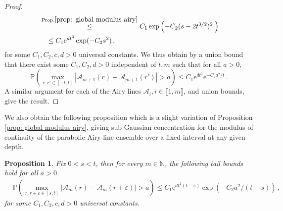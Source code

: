 \documentclass[11pt, reqno]{amsart}
\numberwithin{equation}{section}
\newcounter{dummy} \numberwithin{dummy}{section}
\newtheorem{proposition}[dummy]{Proposition}
\newcommand{\N}{\ensuremath{\mathbb{N}}}
\newcommand{\PP}{\ensuremath{\mathbb{P}}}
\begin{document}
\begin{proof}
\begin{align*}
    & \stackrel{\text{Prop.}\ref{prop: global modulus airy}}{\le} C_1 \exp \left( - C_2 (s - 2t^{3/2})^2_+\right)\\
    & \quad \le C_1 \mathrm{e}^{dt^3}\exp(-C_2 s^2)\,,
    \end{align*}
     for some $C_1, C_2, c, d>0$ universal constants. We thus obtain by a union bound that there exist some $C_1, C_2,d > 0$ independent of $t, m$ such that for all $a>0$,
     \begin{equation*}
     \PP\left(\max_{r, r' \in [-t, t]} |\mathcal{A}_{m+1}(r) - \mathcal{A}_{m+1}(r')|> a\right) \le C_1 \mathrm{e}^{dt^3} \mathrm{e}^{-C_2 a^2/t}\,.
     \end{equation*}
     A similar argument for each of the Airy lines $\mathcal{A}_i, i \in \llbracket 1, m\rrbracket $, and union bounds, give the result.
\end{proof}

We also obtain the following proposition which is a slight variation of Proposition \ref{prop: global modulus airy}, giving sub-Gaussian concentration for the modulus of continuity of the parabolic Airy line ensemble over a fixed interval at any given depth. 
\begin{proposition}\label{prop: parabolic airy level conc}
    Fix $0<s<t$, then for every $m \in \N$, the following tail bounds hold for all $a>0$.
    \begin{align*}
    &\displaystyle\PP\left(\max_{r,r+\varepsilon\in [s,t]}|\mathcal{A}_{m}(r) - \mathcal{A}_{m}(r + \varepsilon)|> a\right)\le C_1 \mathrm{e}^{dt^2(t-s)}\exp(-C_2 a^2/(t-s))\,,
    \end{align*}
     for some $C_1, C_2, c, d>0$ universal constants.  
\end{proposition}
\end{document}
